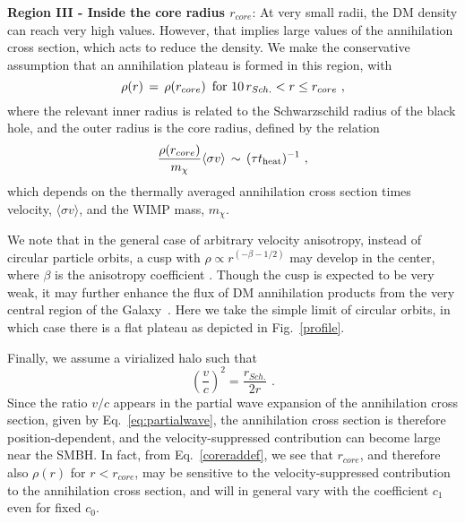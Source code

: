 \documentclass[11pt]{article}
\newcommand{\be}{\begin{equation}}
\newcommand{\ee}{\end{equation}}
\begin{document}


\textbf{Region III - Inside the core radius $r_{core}$}: At very small radii, the DM density can reach very high values. However, that implies large values of the annihilation cross section, which acts to reduce the density. We make the conservative assumption that an annihilation plateau is formed in this region, with
%
\be
\rho (r) \, = \, \rho(r_{core}) \,\,\,{\rm for}\,\, 10 \, r_{Sch.} < r \leq r_{core}\,\,,
\ee
%
where the relevant inner radius is related to the Schwarzschild radius of the black hole, and the outer radius is the core radius, defined by the relation
%
\be \label{coreraddef}
\frac{\rho (r_{core})}{m_\chi} \langle \sigma v \rangle \, \sim \, (\tau t_{\rm heat})^{-1}\,\,,
\ee
% 
which depends on the thermally averaged annihilation cross section times velocity, $\langle\sigma v\rangle$, and the WIMP mass, $m_\chi$.

We note that in the general case of arbitrary velocity anisotropy, instead of circular particle orbits, a cusp with $\rho \propto r^{(-\beta -1/2)}$ may develop in the center, where $\beta$ is the anisotropy coefficient \cite{Vasiliev:2007vh}. Though the cusp is expected to be very weak, it may further enhance the flux of DM annihilation products from the very central region of the Galaxy~\cite{Shapiro:2016ypb}. Here we take the simple limit of circular orbits, in which case there is a flat plateau as depicted in Fig.~\ref{profile}.

Finally,  we assume a virialized halo such that 
%
\be \label{vdepr}
\left(\frac{v}{c}\right)^2 = \frac{r_{Sch.}}{2r}\,\,.
\ee
%
Since the ratio $v/c$ appears in the partial wave expansion of the annihilation cross section, given by Eq.~\ref{eq:partialwave}, the annihilation cross section is therefore position-dependent, and the velocity-suppressed contribution can become large near the SMBH.  In fact, from Eq.~\ref{coreraddef}, we see that $r_{core}$, and therefore also $\rho(r)$ for $r<r_{core}$, may be sensitive to the velocity-suppressed contribution to the annihilation cross section, and will  in general vary with the coefficient $c_1$ even for fixed $c_0$.

\end{document}
